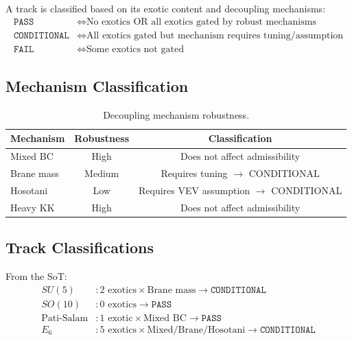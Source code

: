\documentclass[11pt,a4paper]{article}
\begin{document}
A track is classified based on its exotic content and decoupling mechanisms:
\begin{align}
\label{eq:admiss-pass}
\texttt{PASS} &\iff \text{No exotics OR all exotics gated by robust mechanisms} \\
\label{eq:admiss-cond}
\texttt{CONDITIONAL} &\iff \text{All exotics gated but mechanism requires tuning/assumption} \\
\label{eq:admiss-fail}
\texttt{FAIL} &\iff \text{Some exotics not gated}
\end{align}

\subsection{Mechanism Classification}
\label{subsec:mechanism-class}

\begin{table}[ht]
\centering
\caption{Decoupling mechanism robustness.}
\label{tab:mechanism-robust}
\begin{tabular}{lcc}
\toprule
Mechanism & Robustness & Classification \\
\midrule
Mixed BC & High & Does not affect admissibility \\
Brane mass & Medium & Requires tuning $\to$ CONDITIONAL \\
Hosotani & Low & Requires VEV assumption $\to$ CONDITIONAL \\
Heavy KK & High & Does not affect admissibility \\
\bottomrule
\end{tabular}
\end{table}

\subsection{Track Classifications}
\label{subsec:track-class}

From the SoT:
\begin{align}
\label{eq:class-su5}
SU(5) &: 2 \text{ exotics} \times \text{Brane mass} \to \texttt{CONDITIONAL} \\
\label{eq:class-so10}
SO(10) &: 0 \text{ exotics} \to \texttt{PASS} \\
\label{eq:class-ps}
\text{Pati-Salam} &: 1 \text{ exotic} \times \text{Mixed BC} \to \texttt{PASS} \\
\label{eq:class-e6}
E_6 &: 5 \text{ exotics} \times \text{Mixed/Brane/Hosotani} \to \texttt{CONDITIONAL}
\end{align}
\end{document}
